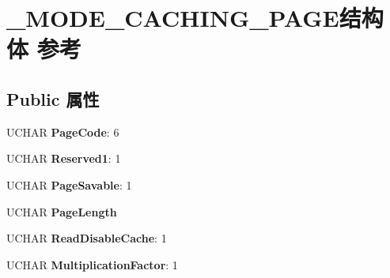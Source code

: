 \hypertarget{struct___m_o_d_e___c_a_c_h_i_n_g___p_a_g_e}{}\section{\+\_\+\+M\+O\+D\+E\+\_\+\+C\+A\+C\+H\+I\+N\+G\+\_\+\+P\+A\+G\+E结构体 参考}
\label{struct___m_o_d_e___c_a_c_h_i_n_g___p_a_g_e}
\subsection*{Public 属性}
\begin{DoxyCompactItemize}
\item 
\mbox{\label{struct___m_o_d_e___c_a_c_h_i_n_g___p_a_g_e_ad328cc10623433d8fc2c2023d96e4bb0}} 
U\+C\+H\+AR {\bfseries Page\+Code}\+: 6
\item 
\mbox{\label{struct___m_o_d_e___c_a_c_h_i_n_g___p_a_g_e_a7f986494be33b66d53fb7bf780cff4ef}} 
U\+C\+H\+AR {\bfseries Reserved1}\+: 1
\item 
\mbox{\label{struct___m_o_d_e___c_a_c_h_i_n_g___p_a_g_e_a781a790e541af8a7c761930d570b9e0f}} 
U\+C\+H\+AR {\bfseries Page\+Savable}\+: 1
\item 
\mbox{\label{struct___m_o_d_e___c_a_c_h_i_n_g___p_a_g_e_aac0cab59accbe65efe62c7ea3c14b770}} 
U\+C\+H\+AR {\bfseries Page\+Length}
\item 
\mbox{\label{struct___m_o_d_e___c_a_c_h_i_n_g___p_a_g_e_af7e85431fdee643945e0cc49ae855d59}} 
U\+C\+H\+AR {\bfseries Read\+Disable\+Cache}\+: 1
\item 
\mbox{\label{struct___m_o_d_e___c_a_c_h_i_n_g___p_a_g_e_a04818d1e8420218a3210324072a0bc2b}} 
U\+C\+H\+AR {\bfseries Multiplication\+Factor}\+: 1
\item 
\mbox{\label{struct___m_o_d_e___c_a_c_h_i_n_g___p_a_g_e_a28ff0776182a27136dcc0465aea65e44}} 

\end{DoxyCompactItemize}
